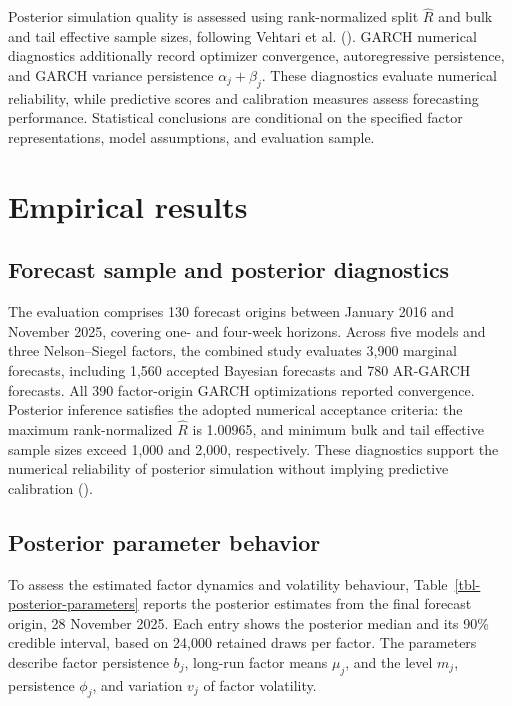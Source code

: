 \documentclass[
  12pt,
  letterpaper,
  DIV=11,
  numbers=noendperiod]{scrreprt}
\begin{document}
Posterior simulation quality is assessed using rank-normalized split
\(\widehat R\) and bulk and tail effective sample sizes, following
Vehtari et al. (). GARCH numerical
diagnostics additionally record optimizer convergence, autoregressive
persistence, and GARCH variance persistence \(\alpha_j+\beta_j\). These
diagnostics evaluate numerical reliability, while predictive scores and
calibration measures assess forecasting performance. Statistical
conclusions are conditional on the specified factor representations,
model assumptions, and evaluation sample.

\chapter{Empirical results}\label{sec-results}

\section{Forecast sample and posterior
diagnostics}\label{forecast-sample-and-posterior-diagnostics}

The evaluation comprises 130 forecast origins between January 2016 and
November 2025, covering one- and four-week horizons. Across five models
and three Nelson--Siegel factors, the combined study evaluates 3,900
marginal forecasts, including 1,560 accepted Bayesian forecasts and 780
AR-GARCH forecasts. All 390 factor-origin GARCH optimizations reported
convergence. Posterior inference satisfies the adopted numerical
acceptance criteria: the maximum rank-normalized \(\widehat R\) is
1.00965, and minimum bulk and tail effective sample sizes exceed 1,000
and 2,000, respectively. These diagnostics support the numerical
reliability of posterior simulation without implying predictive
calibration ().

\section{Posterior parameter
behavior}\label{posterior-parameter-behavior}

To assess the estimated factor dynamics and volatility behaviour,
Table~\ref{tbl-posterior-parameters} reports the posterior estimates
from the final forecast origin, 28 November 2025. Each entry shows the
posterior median and its 90\% credible interval, based on 24,000
retained draws per factor. The parameters describe factor persistence
\(b_j\), long-run factor means \(\mu_j\), and the level \(m_j\),
persistence \(\phi_j\), and variation \(v_j\) of factor volatility.
\end{document}
